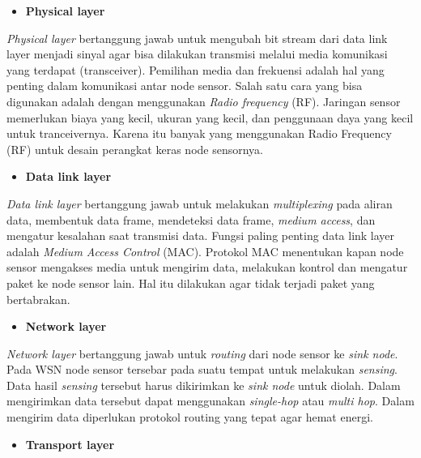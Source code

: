 \documentclass[a4paper,twoside]{article}
\begin{document}
\begin{enumerate}
\begin{itemize}
\item \textbf{Physical layer}
\end{itemize}	

\textit{Physical layer} bertanggung jawab untuk mengubah bit stream dari data link layer menjadi sinyal agar bisa dilakukan transmisi melalui media komunikasi yang terdapat (transceiver). Pemilihan media dan frekuensi adalah hal yang penting dalam komunikasi antar node sensor. Salah satu cara yang bisa digunakan adalah dengan menggunakan \textit{Radio frequency} (RF). Jaringan sensor memerlukan biaya yang kecil, ukuran yang kecil, dan penggunaan daya yang kecil untuk tranceivernya. Karena itu banyak yang menggunakan Radio Frequency (RF) untuk desain perangkat keras node sensornya.

\begin{itemize}
\item \textbf{Data link layer}
\end{itemize}

\textit{Data link layer} bertanggung jawab untuk melakukan \textit{multiplexing} pada aliran data, membentuk data frame, mendeteksi data frame, \textit{medium access}, dan mengatur kesalahan saat transmisi data. Fungsi paling penting data link layer adalah \textit{Medium Access Control} (MAC). Protokol MAC menentukan kapan node sensor mengakses media untuk mengirim data, melakukan kontrol dan mengatur paket ke node sensor lain. Hal itu dilakukan agar tidak terjadi paket yang bertabrakan.


\begin{itemize}
\item \textbf{Network layer}
\end{itemize}

\textit{Network layer} bertanggung jawab untuk \textit{routing} dari node sensor ke \textit{sink node}. Pada WSN node sensor tersebar pada suatu tempat untuk melakukan \textit{sensing}. Data hasil \textit{sensing} tersebut harus dikirimkan ke \textit{sink node} untuk diolah. Dalam mengirimkan data tersebut dapat menggunakan \textit{single-hop} atau \textit{multi hop}. Dalam mengirim data diperlukan protokol routing yang tepat agar hemat energi.

\begin{itemize}
\item \textbf{Transport layer}
\end{itemize}


\end{enumerate}
\end{document}
